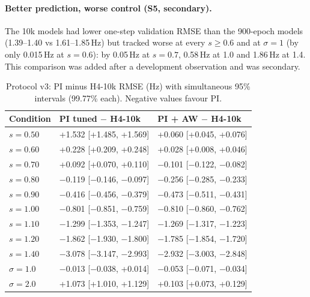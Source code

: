 \documentclass[11pt]{article}
\newcommand{\Hz}{\,Hz}
\begin{document}
\paragraph{Better prediction, worse control (S5, secondary).} The 10k models had lower one-step validation RMSE than the 900-epoch models (1.39--1.40 vs 1.61--1.85\Hz) but tracked worse at every $s\ge0.6$ and at $\sigma=1$ (by only 0.015\Hz{} at $s=0.6$): by 0.05\Hz{} at $s=0.7$, 0.58\Hz{} at 1.0 and 1.86\Hz{} at 1.4. This comparison was added after a development observation and was secondary.

\begin{table}[t]\centering\small
\caption{Protocol v3: PI minus H4-10k RMSE (Hz) with simultaneous 95\% intervals (99.77\% each). Negative values favour PI.}\label{tab:b1}
\begin{tabular}{@{}lll@{}}\toprule
Condition & PI tuned $-$ H4-10k & PI + AW $-$ H4-10k\\\midrule
$s=0.50$ & +1.532 [+1.485, +1.569] & +0.060 [+0.045, +0.076] \\
$s=0.60$ & +0.228 [+0.209, +0.248] & +0.028 [+0.008, +0.046] \\
$s=0.70$ & +0.092 [+0.070, +0.110] & $-$0.101 [$-$0.122, $-$0.082] \\
$s=0.80$ & $-$0.119 [$-$0.146, $-$0.097] & $-$0.256 [$-$0.285, $-$0.233] \\
$s=0.90$ & $-$0.416 [$-$0.456, $-$0.379] & $-$0.473 [$-$0.511, $-$0.431] \\
$s=1.00$ & $-$0.801 [$-$0.851, $-$0.759] & $-$0.810 [$-$0.860, $-$0.762] \\
$s=1.10$ & $-$1.299 [$-$1.353, $-$1.247] & $-$1.269 [$-$1.317, $-$1.223] \\
$s=1.20$ & $-$1.862 [$-$1.930, $-$1.800] & $-$1.785 [$-$1.854, $-$1.720] \\
$s=1.40$ & $-$3.078 [$-$3.147, $-$2.993] & $-$2.932 [$-$3.003, $-$2.848] \\
$\sigma=1.0$ & $-$0.013 [$-$0.038, +0.014] & $-$0.053 [$-$0.071, $-$0.034] \\
$\sigma=2.0$ & +1.073 [+1.010, +1.129] & +0.103 [+0.073, +0.129] \\
\bottomrule\end{tabular}\end{table}
\end{document}
